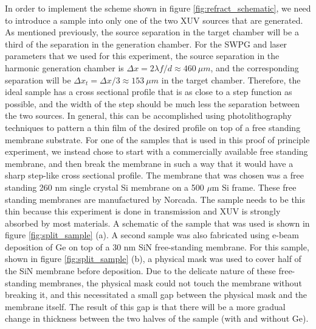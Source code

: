 In order to implement the scheme shown in figure \ref{fig:refract_schematic}, we need to introduce a sample into only one of the two XUV sources that are generated.  As mentioned previously, the source separation in the target chamber will be a third of the separation in the generation chamber. For the SWPG and laser parameters that we used for this experiment, the source separation in the harmonic generation chamber is $\Delta x=2\lambda f/d\approx460\:\mu m$, and the corresponding separation will be $\Delta x_t = \Delta x/3\approx153\: \mu m$ in the target chamber.  Therefore, the ideal sample has a cross sectional profile that is as close to a step function as possible, and the width of the step should be much less the separation between the two sources.  In general, this can be accomplished using photolithography techniques to pattern a thin film of the desired profile on top of a free standing membrane substrate.  For one of the samples that is used in this proof of principle experiment, we instead chose to start with a commercially available free standing membrane, and then break the membrane in such a way that it would have a sharp step-like cross sectional profile.  The membrane that was chosen was a free standing 260 nm single crystal Si membrane on a 500 $\mu$m Si frame.  These free standing membranes are manufactured by Norcada.  The sample needs to be this thin because this experiment is done in transmission and XUV is strongly absorbed by most materials. A schematic of the sample that was used is shown in figure \ref{fig:split_sample} (a).  A second sample was also fabricated using e-beam deposition of Ge on top of a 30 nm SiN free-standing membrane.  For this sample, shown in figure \ref{fig:split_sample} (b), a physical mask was used to cover half of the SiN membrane before deposition.  Due to the delicate nature of these free-standing membranes, the physical mask could not touch the membrane without breaking it, and this necessitated a small gap between the physical mask and the membrane itself.  The result of this gap is that there will be a more gradual change in thickness between the two halves of the sample (with and without Ge).

